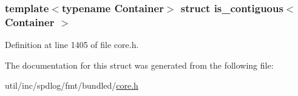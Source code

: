 \subsubsection*{template$<$typename Container$>$\newline
struct is\+\_\+contiguous$<$ Container $>$}



Definition at line 1405 of file core.\+h.



The documentation for this struct was generated from the following file\+:\begin{DoxyCompactItemize}
\item 
util/inc/spdlog/fmt/bundled/\hyperlink{core_8h}{core.\+h}\end{DoxyCompactItemize}
